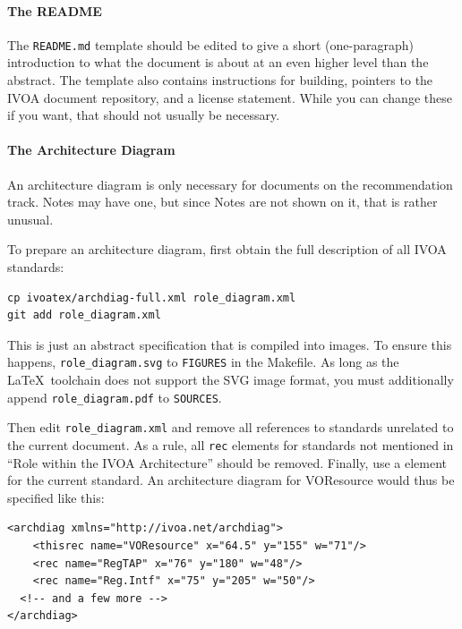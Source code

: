 \documentclass[11pt,a4paper]{ivoa}
\begin{document}
\paragraph{The README}

The \verb|README.md| template should be edited to give a short
(one-paragraph) introduction to what the document is about at an even
higher level than the abstract.  The template also contains instructions
for building, pointers to the IVOA document repository, and a license
statement.  While you can change these if you want, that should not
usually be necessary.


\paragraph{The Architecture Diagram}
\label{sect:archdiag}

An architecture diagram is only
necessary for documents on the recommendation track.  Notes may have
one, but since Notes are not shown on it, that is rather
unusual.

To prepare an architecture diagram, first obtain the full description of
all IVOA standards:

\begin{lstlisting}
cp ivoatex/archdiag-full.xml role_diagram.xml
git add role_diagram.xml
\end{lstlisting}

This is just an abstract specification that is compiled into images.  To
ensure this happens, \verb|role_diagram.svg| to \verb|FIGURES| in the
Makefile.  As long as the \LaTeX~toolchain does not support the SVG
image format, you must additionally append \verb|role_diagram.pdf| to
\verb|SOURCES|.

Then edit
\texttt{role\_diagram.xml} and remove all references to standards unrelated
to the current document.  As a rule, all \texttt{rec} elements for
standards not mentioned in
``Role within the IVOA Architecture'' should be removed.  Finally, use a
 element for the current standard.  An architecture
diagram for VOResource would thus be specified like this:

\begin{lstlisting}[basicstyle=\footnotesize]
<archdiag xmlns="http://ivoa.net/archdiag">
	<thisrec name="VOResource" x="64.5" y="155" w="71"/>
	<rec name="RegTAP" x="76" y="180" w="48"/>
	<rec name="Reg.Intf" x="75" y="205" w="50"/>
  <!-- and a few more -->
</archdiag>
\end{lstlisting}
\end{document}

